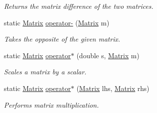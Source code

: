 \begin{DoxyCompactItemize}
\begin{DoxyCompactList}\small\item\em Returns the matrix difference of the two matrices. \end{DoxyCompactList}\item 
static \mbox{\hyperlink{class_matrix_demo_1_1_r_t_w_1_1_matrix}{Matrix}} \mbox{\hyperlink{class_matrix_demo_1_1_r_t_w_1_1_matrix_a115c01ce2236a801cfa99bb685aea0ff}{operator-\/}} (\mbox{\hyperlink{class_matrix_demo_1_1_r_t_w_1_1_matrix}{Matrix}} m)
\begin{DoxyCompactList}\small\item\em Takes the opposite of the given matrix. \end{DoxyCompactList}\item 
static \mbox{\hyperlink{class_matrix_demo_1_1_r_t_w_1_1_matrix}{Matrix}} \mbox{\hyperlink{class_matrix_demo_1_1_r_t_w_1_1_matrix_ae315e38f4441e1df65dd5226b55314ea}{operator$\ast$}} (double s, \mbox{\hyperlink{class_matrix_demo_1_1_r_t_w_1_1_matrix}{Matrix}} m)
\begin{DoxyCompactList}\small\item\em Scales a matrix by a scalar. \end{DoxyCompactList}\item 
static \mbox{\hyperlink{class_matrix_demo_1_1_r_t_w_1_1_matrix}{Matrix}} \mbox{\hyperlink{class_matrix_demo_1_1_r_t_w_1_1_matrix_a5d72530d3d2ddc47341e82ec1a076b71}{operator$\ast$}} (\mbox{\hyperlink{class_matrix_demo_1_1_r_t_w_1_1_matrix}{Matrix}} lhs, \mbox{\hyperlink{class_matrix_demo_1_1_r_t_w_1_1_matrix}{Matrix}} rhs)
\begin{DoxyCompactList}\small\item\em Performs matrix multiplication. \end{DoxyCompactList}\end{DoxyCompactItemize}
